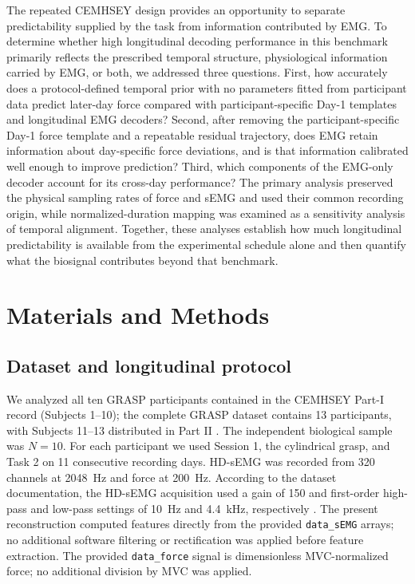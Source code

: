 \documentclass[preprint,12pt]{elsarticle}
\begin{document}
The repeated CEMHSEY design provides an opportunity to separate predictability supplied by the task from information contributed by EMG. To determine whether high longitudinal decoding performance in this benchmark primarily reflects the prescribed temporal structure, physiological information carried by EMG, or both, we addressed three questions. First, how accurately does a protocol-defined temporal prior with no parameters fitted from participant data predict later-day force compared with participant-specific Day-1 templates and longitudinal EMG decoders? Second, after removing the participant-specific Day-1 force template and a repeatable residual trajectory, does EMG retain information about day-specific force deviations, and is that information calibrated well enough to improve prediction? Third, which components of the EMG-only decoder account for its cross-day performance? The primary analysis preserved the physical sampling rates of force and sEMG and used their common recording origin, while normalized-duration mapping was examined as a sensitivity analysis of temporal alignment. Together, these analyses establish how much longitudinal predictability is available from the experimental schedule alone and then quantify what the biosignal contributes beyond that benchmark.

\section{Materials and Methods}

\subsection{Dataset and longitudinal protocol}

We analyzed all ten GRASP participants contained in the CEMHSEY Part-I record (Subjects 1--10); the complete GRASP dataset contains 13 participants, with Subjects 11--13 distributed in Part II \cite{Yang2025}. The independent biological sample was $N=10$. For each participant we used Session 1, the cylindrical grasp, and Task 2 on 11 consecutive recording days. HD-sEMG was recorded from 320 channels at 2048~Hz and force at 200~Hz. According to the dataset documentation, the HD-sEMG acquisition used a gain of 150 and first-order high-pass and low-pass settings of 10~Hz and 4.4~kHz, respectively \cite{Yang2025}. The present reconstruction computed features directly from the provided \texttt{data\_sEMG} arrays; no additional software filtering or rectification was applied before feature extraction. The provided \texttt{data\_force} signal is dimensionless MVC-normalized force; no additional division by MVC was applied.
\end{document}
